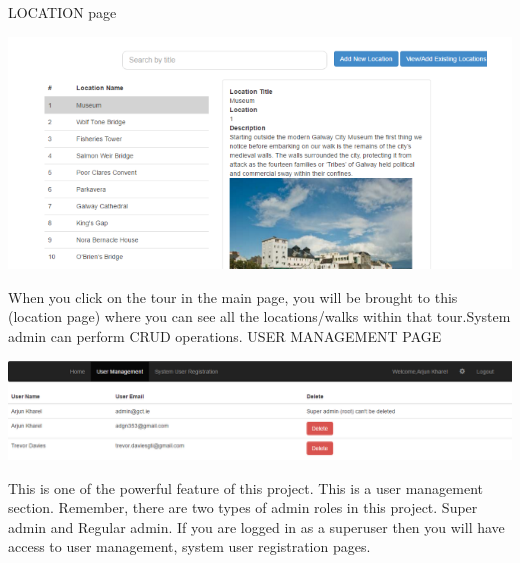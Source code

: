 		 		LOCATION page
		 		\begin{center}    
		 			\includegraphics{img/locationPage.PNG}
		 		\end{center}
		 		When you click on the tour in the main page, you will be brought to this (location page) where you can see all the locations/walks within that tour.System admin can perform CRUD operations. 
		 		 	USER MANAGEMENT PAGE
		 			\begin{center}    
		 				\includegraphics{img/userManagement.PNG}
		 			\end{center}
		 		
		 			This is one of the powerful feature of this project. This is a user management section.  Remember, there are two types of admin roles in this project. Super admin and Regular admin. If you are logged in as a superuser then you will have access to user management, system user registration pages.
